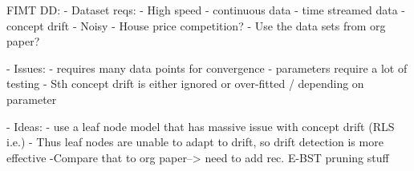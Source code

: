 FIMT DD: 
  - Dataset reqs:
     - High speed
     - continuous data
     - time streamed data
     - concept drift
     - Noisy
     - House price competition?
     - Use the data sets from org paper?
     
     
     
 - Issues:
     - requires many data points for convergence
     - parameters require a lot of testing 
     - Sth concept drift is either ignored or over-fitted / depending on parameter
     

- Ideas:
    - use a leaf node model that has massive issue with concept drift (RLS i.e.)
    - Thus leaf nodes are unable to adapt to drift, so drift detection is more  effective
    -Compare that to org paper--> need to add rec. E-BST pruning stuff
     
     